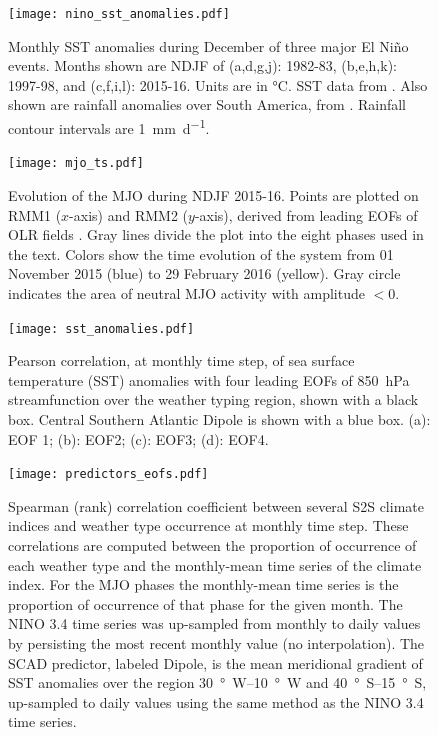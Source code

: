 \documentclass{article}
\begin{document}
\begin{figure}
	\texttt{[image: nino\_sst\_anomalies.pdf]}
	\caption{
		Monthly SST anomalies during December of three major El Ni\~{n}o events.
		Months shown are NDJF of (a,d,g,j): 1982-83, (b,e,h,k): 1997-98, and (c,f,i,l): 2015-16.
		Units are in \si{\celsius}.
		SST data from \citet{Reynolds2002}.
		Also shown are rainfall anomalies over South America, from \citet{Chen2008}.
		Rainfall contour intervals are \SI{1}{\milli\meter\per\day}.
	}
\end{figure}

\begin{figure}
	\texttt{[image: mjo\_ts.pdf]}
	\caption{
		Evolution of the MJO during NDJF 2015-16.
		Points are plotted on RMM1 ($x$-axis) and RMM2 ($y$-axis), derived from leading EOFs of OLR fields \citep{Wheeler2004}.
		Gray lines divide the plot into the eight phases used in the text.
		Colors show the time evolution of the system from 01 November 2015 (blue) to 29 February 2016 (yellow).
		Gray circle indicates the area of neutral MJO activity with amplitude $<0$.
	}
\end{figure}

\begin{figure}
	\noindent\texttt{[image: sst\_anomalies.pdf]}
	\caption{
		Pearson correlation, at monthly time step, of  sea surface temperature (SST) anomalies \citep{Reynolds2002} with four leading EOFs of \SI{850}{\hecto\pascal} streamfunction over the weather typing region, shown with a black box.
		Central Southern Atlantic Dipole is shown with a blue box.
		(a): EOF 1; (b): EOF2; (c): EOF3; (d): EOF4.
	}\label{fig:sst-anomalies}
\end{figure}

\begin{figure}
	\texttt{[image: predictors\_eofs.pdf]}
	\caption{
		Spearman (rank) correlation coefficient between several S2S climate indices and weather type occurrence at monthly time step.
		These correlations are computed between the proportion of occurrence of each weather type and the monthly-mean time series of the climate index.
		For the MJO phases the monthly-mean time series is the proportion of occurrence of that phase for the given month.
		The NINO 3.4 time series was up-sampled from monthly to daily values by persisting the most recent monthly value (no interpolation).
		The SCAD predictor, labeled Dipole, is the mean meridional gradient of SST anomalies over the region \SIrange{30}{10}{\degree W} and \SIrange{40}{15}{\degree S}, up-sampled to daily values using the same method as the NINO 3.4 time series.
	}\label{fig:predictor-eof}
\end{figure}

\clearpage


\end{document}
